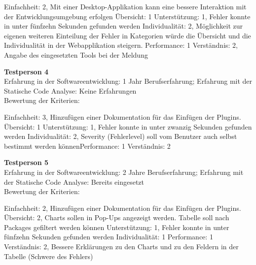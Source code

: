 Einfachheit: 2, Mit einer Desktop-Applikation kann eine bessere Interaktion mit der Entwicklungsumgebung erfolgen \newline Übersicht: 1 \newline  Unterstützung: 1, Fehler konnte in unter fünfzehn Sekunden gefunden werden \newline Individualität: 2, Möglichkeit zur eigenen weiteren Einteilung der Fehler in Kategorien würde die Übersicht und die Individualität in der Webapplikation steigern.  \newline Performance: 1 \newline  Verständnis: 2, Angabe des eingesetzten Tools bei der Meldung\newline 

\textbf{Testperson 4} \\
Erfahrung in der Softwareentwicklung: 1 Jahr Berufserfahrung; Erfahrung mit der Statische Code Analyse: Keine Erfahrungen\\
Bewertung der Kriterien:

Einfachheit: 3, Hinzufügen einer Dokumentation für das Einfügen der Plugins.  \newline Übersicht: 1 \newline  Unterstützung: 1, Fehler konnte in unter zwanzig Sekunden gefunden werden \newline Individualität: 2, Severity (Fehlerlevel) soll vom Benutzer auch selbst bestimmt werden können\newline Performance: 1 \newline  Verständnis: 2\newline 

\textbf{Testperson 5} \\
Erfahrung in der Softwareentwicklung: 2 Jahre Berufserfahrung; Erfahrung mit der Statische Code Analyse: Bereits eingesetzt\\
Bewertung der Kriterien:

Einfachheit: 2, Hinzufügen einer Dokumentation für das Einfügen der Plugins.  \newline Übersicht: 2, Charts sollen in Pop-Ups angezeigt werden. Tabelle soll nach Packages gefiltert werden können \newline  Unterstützung: 1, Fehler konnte in unter fünfzehn Sekunden gefunden werden \newline Individualität: 1 \newline Performance: 1 \newline  Verständnis: 2, Bessere Erklärungen zu den Charts und zu den Feldern in der Tabelle (Schwere des Fehlers)\newline 


